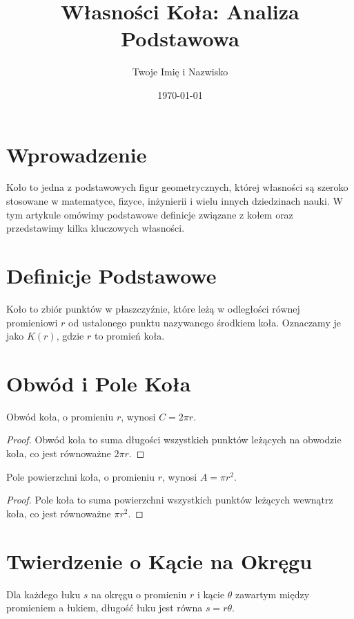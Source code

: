 \documentclass[12pt]{article}
\title{Własności Koła: Analiza Podstawowa}
\author{Twoje Imię i Nazwisko}
\date{\today}
\begin{document}
\maketitle

\section{Wprowadzenie}
Koło to jedna z podstawowych figur geometrycznych, której własności są szeroko stosowane w matematyce, fizyce, inżynierii i wielu innych dziedzinach nauki. W tym artykule omówimy podstawowe definicje związane z kołem oraz przedstawimy kilka kluczowych własności.

\section{Definicje Podstawowe}
Koło to zbiór punktów w płaszczyźnie, które leżą w odległości równej promieniowi $r$ od ustalonego punktu nazywanego środkiem koła. Oznaczamy je jako $K(r)$, gdzie $r$ to promień koła.

\section{Obwód i Pole Koła}
\begin{theorem}
Obwód koła, o promieniu $r$, wynosi $C = 2\pi r$.
\end{theorem}

\begin{proof}
Obwód koła to suma długości wszystkich punktów leżących na obwodzie koła, co jest równoważne $2\pi r$.
\end{proof}

\begin{theorem}
Pole powierzchni koła, o promieniu $r$, wynosi $A = \pi r^2$.
\end{theorem}

\begin{proof}
Pole koła to suma powierzchni wszystkich punktów leżących wewnątrz koła, co jest równoważne $\pi r^2$.
\end{proof}

\section{Twierdzenie o Kącie na Okręgu}
\begin{theorem}
Dla każdego łuku $s$ na okręgu o promieniu $r$ i kącie $\theta$ zawartym między promieniem a łukiem, długość łuku jest równa $s = r\theta$.
\end{theorem}
\end{document}
